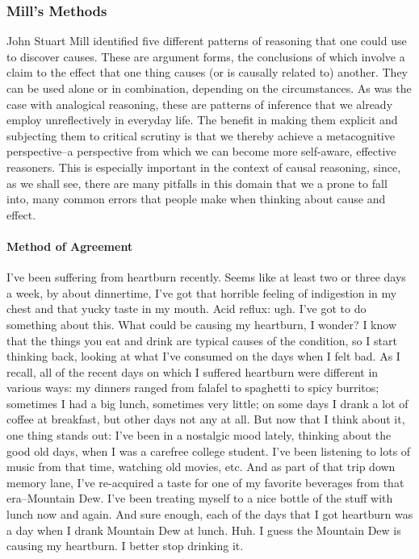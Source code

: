 \subsubsection{Mill's Methods}
John Stuart Mill identified five different patterns of reasoning that one could use to discover
causes. These are argument forms, the conclusions of which involve a claim to the effect that one
thing causes (or is causally related to) another. They can be used alone or in combination,
depending on the circumstances. As was the case with analogical reasoning, these are patterns of
inference that we already employ unreflectively in everyday life. The benefit in making them
explicit and subjecting them to critical scrutiny is that we thereby achieve a metacognitive
perspective--a perspective from which we can become more self-aware, effective reasoners. This
is especially important in the context of causal reasoning, since, as we shall see, there are many
pitfalls in this domain that we a prone to fall into, many common errors that people make when
thinking about cause and effect.

\paragraph{Method of Agreement}

I've been suffering from heartburn recently. Seems like at least two or three days a week, by about
dinnertime, I've got that horrible feeling of indigestion in my chest and that yucky taste in my
mouth. Acid reflux: ugh. I've got to do something about this. What could be causing my heartburn,
I wonder? I know that the things you eat and drink are typical causes of the condition, so I start
thinking back, looking at what I've consumed on the days when I felt bad. As I recall, all of the
recent days on which I suffered heartburn were different in various ways: my dinners ranged from
falafel to spaghetti to spicy burritos; sometimes I had a big lunch, sometimes very little; on some
days I drank a lot of coffee at breakfast, but other days not any at all. But now that I think about it,
one thing stands out: I've been in a nostalgic mood lately, thinking about the good old days, when
I was a carefree college student. I've been listening to lots of music from that time, watching old
movies, etc. And as part of that trip down memory lane, I've re-acquired a taste for one of my
favorite beverages from that era--Mountain Dew. I've been treating myself to a nice bottle of the
stuff with lunch now and again. And sure enough, each of the days that I got heartburn was a day
when I drank Mountain Dew at lunch. Huh. I guess the Mountain Dew is causing my heartburn. I
better stop drinking it.

